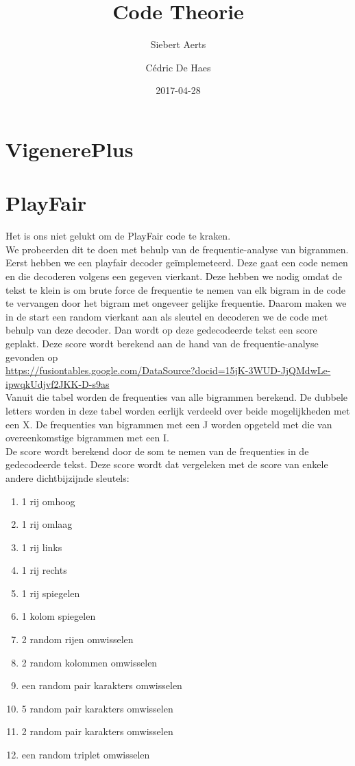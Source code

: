 \documentclass{article}
\title{Code Theorie}
\date{2017-04-28}
\author{Siebert Aerts \and C\'{e}dric De Haes}
\begin{document}
	\section{VigenerePlus}
	\section{PlayFair}
	Het is ons niet gelukt om de PlayFair code te kraken.\\
	We probeerden dit te doen met behulp van de frequentie-analyse van bigrammen. Eerst hebben we een playfair decoder ge\"{i}mplemeteerd. Deze gaat een code nemen en die decoderen volgens een gegeven vierkant. Deze hebben we nodig omdat de tekst te klein is om brute force de frequentie te nemen van elk bigram in de code te vervangen door het bigram met ongeveer gelijke frequentie. Daarom maken we in de start een random vierkant aan als sleutel en decoderen we de code met behulp van deze decoder. Dan wordt op deze gedecodeerde tekst een score geplakt. Deze score wordt berekend aan de hand van de frequentie-analyse gevonden op \\ \url{https://fusiontables.google.com/DataSource?docid=15jK-3WUD-JjQMdwLe-ipwqkUdjvf2JKK-D-s9as}\\
	Vanuit die tabel worden de frequenties van alle bigrammen berekend. De dubbele letters worden in deze tabel worden eerlijk verdeeld over beide mogelijkheden met een X. De frequenties van bigrammen met een J worden opgeteld met die van overeenkomstige bigrammen met een I.\\
	De score wordt berekend door de som te nemen van de frequenties in de gedecodeerde tekst.
	Deze score wordt dat vergeleken met de score van enkele andere dichtbijzijnde sleutels:
	\begin{enumerate}
		\item 1 rij omhoog
		\item 1 rij omlaag
		\item 1 rij links
		\item 1 rij rechts
		\item 1 rij spiegelen
		\item 1 kolom spiegelen
		\item 2 random rijen omwisselen
		\item 2 random kolommen omwisselen
		\item een random pair karakters omwisselen
		\item 5 random pair karakters omwisselen
		\item 2 random pair karakters omwisselen
		\item een random triplet omwisselen
	\end{enumerate}
\end{document}
